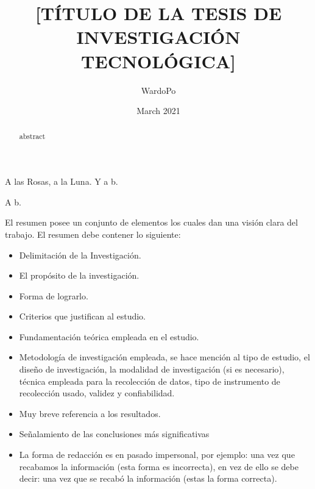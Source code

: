 \documentclass[12]{tesis_tecnologica}
\title{[TÍTULO DE LA TESIS DE INVESTIGACIÓN TECNOLÓGICA]}
\author{WardoPo}
\date{March 2021}
\begin{document}


\begin{dedicatoria}
A las Rosas, a la Luna.
Y a \acrlong{b}.
\end{dedicatoria}

\begin{agradecimientos}
A \acrshort{b}.
\end{agradecimientos}

\tableofcontents
\printglossary[type=\acronymtype]
\listoffigures
\listoftables
\printglossary

\begin{resumen}
El resumen posee un conjunto de elementos los cuales dan una visión clara del trabajo. El resumen debe contener lo siguiente: 

\begin{itemize}
    \item Delimitación de la Investigación.
    \item El propósito de la investigación. 
    \item Forma de lograrlo. 
    \item Criterios que justifican al estudio. 
    \item Fundamentación teórica empleada en el estudio. 
    \item Metodología de investigación empleada, se hace mención al tipo de estudio, el diseño de investigación, la modalidad de investigación (si es necesario),  técnica empleada para la recolección de datos, tipo de instrumento de recolección usado, validez y confiabilidad.
    \item Muy breve referencia a los resultados. 
    \item Señalamiento de las conclusiones más significativas 
    \item La forma de redacción es en pasado impersonal, por ejemplo: una vez que recabamos la información (esta forma es incorrecta), en vez de ello se debe decir: una vez que se recabó la información (estas la forma correcta). 
\end{itemize}

\end{resumen}

\begin{abstract}
    
    \Gls{abstract}
    
\end{abstract}

\begin{palabras_clave}

\end{palabras_clave}
\end{document}
